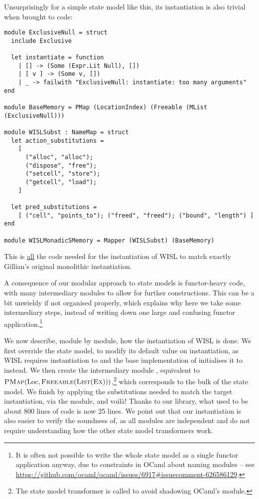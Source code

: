 Unsurprisingly for a simple state model like this, its instantiation is also trivial when brought to code: \begin{lstlisting}
module ExclusiveNull = struct
  include Exclusive

  let instantiate = function
    | [] -> (Some (Expr.Lit Null), [])
    | [ v ] -> (Some v, [])
    | _ -> failwith "ExclusiveNull: instantiate: too many arguments"
end

module BaseMemory = PMap (LocationIndex) (Freeable (MList (ExclusiveNull)))

module WISLSubst : NameMap = struct
  let action_substitutions =
    [
      ("alloc", "alloc");
      ("dispose", "free");
      ("setcell", "store");
      ("getcell", "load");
    ]

  let pred_substitutions =
    [ ("cell", "points_to"); ("freed", "freed"); ("bound", "length") ]
end

module WISLMonadicSMemory = Mapper (WISLSubst) (BaseMemory)
\end{lstlisting}
This is \underline{all} the code needed for the instantiation of WISL to match exactly Gillian's original monolithic instantiation.

A consequence of our modular approach to state models is functor-heavy code, with many intermediary modules to allow for further constructions. This can be a bit unwieldy if not organised properly, which explains why here we take some intermediary steps, instead of writing down one large and confusing functor application.\footnote{It is often not possible to write the whole state model as a single functor application anyway, due to constraints in OCaml about naming modules -- see \url{https://github.com/ocaml/ocaml/issues/6917\#issuecomment-626586129}.}

We now describe, module by module, how the instantiation of WISL is done. We first override the \Ex{} state model, to modify its default value on instantiation, as WISL requires instantiation to  and the base implementation of \Ex{} initialises it to  instead. We then create the intermediary module , equivalent to $\textsc{PMap}(\text{Loc},\textsc{Freeable}(\textsc{List}(\textsc{Ex})))$,\footnote{The \List{} state model transformer is called  to avoid shadowing OCaml's  module.} which corresponds to the bulk of the state model. We finish by applying the substitutions needed to match the target instantiation, via the  module, and voilà! Thanks to our library, what used to be about 800 lines of code is now 25 lines. We point out that our instantiation is also easier to verify the soundness of, as all modules are independent and do not require understanding how the other state model transformers work.

